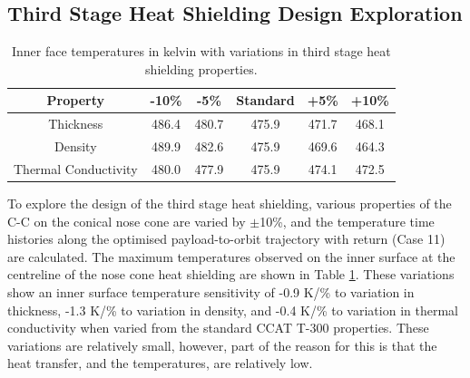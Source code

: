 \subsection{Third Stage Heat Shielding Design Exploration}\label{sec:thirdstageheat}
\begin{table}[!ht]
	\centering
	\begin{tabular}{|c|c|c|c|c|c|}
		\hline Property & -10\% & -5\% & Standard & +5\% & +10\% \\ 
		\hline Thickness & 486.4 & 480.7 & 475.9 &  471.7 & 468.1  \\ 
		\hline Density &  489.9 & 482.6 & 475.9 & 469.6 &  464.3\\ 
		\hline Thermal Conductivity & 480.0 & 477.9 & 475.9 & 474.1 & 472.5 \\ 
		\hline 
	\end{tabular} 
	
	\caption{Inner face temperatures in kelvin with variations in third stage heat shielding properties.}
	\label{tab:tpsthirdstage}
\end{table}
To explore the design of the third stage heat shielding, various properties of the C-C on the conical nose cone are varied by $\pm$10\%, and the temperature time histories along the optimised payload-to-orbit trajectory with return (Case 11) are calculated. The maximum temperatures observed on the inner surface at the centreline of the nose cone heat shielding are shown in Table \ref{tab:tpsthirdstage}. These variations show an inner surface temperature sensitivity of -0.9 K/\% to variation in thickness, -1.3 K/\% to variation in density, and -0.4 K/\% to variation in thermal conductivity when varied from the standard CCAT T-300 properties. These variations are relatively small, however, part of the reason for this is that the heat transfer, and the temperatures, are relatively low. 






